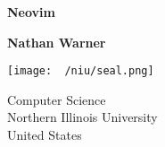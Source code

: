 \documentclass{report}
\title{\Huge{}}
\author{\huge{Nathan Warner}}
\date{\huge{}}
\begin{document}
        \begin{titlepage}
       \begin{center}
           \vspace*{1cm}
    
           \textbf{Neovim}
    
           \vspace{0.5cm}
            
                
           \vspace{1.5cm}
    
           \textbf{Nathan Warner}
    
           \vfill
                
                
           \vspace{0.8cm}
         
           \texttt{[image: ~/niu/seal.png]}
                
           Computer Science \\
           Northern Illinois University\\
           United States\\
           
                
       \end{center}
    \end{titlepage}
    \tableofcontents
    \pagebreak 
    \bigbreak \noindent 
\end{document}
